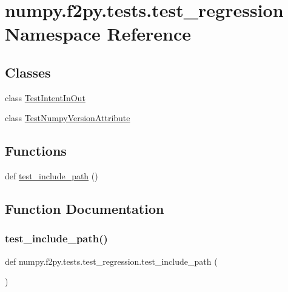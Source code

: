 \hypertarget{namespacenumpy_1_1f2py_1_1tests_1_1test__regression}{}\section{numpy.\+f2py.\+tests.\+test\+\_\+regression Namespace Reference}
\label{namespacenumpy_1_1f2py_1_1tests_1_1test__regression}
\subsection*{Classes}
\begin{DoxyCompactItemize}
\item 
class \hyperlink{classnumpy_1_1f2py_1_1tests_1_1test__regression_1_1TestIntentInOut}{Test\+Intent\+In\+Out}
\item 
class \hyperlink{classnumpy_1_1f2py_1_1tests_1_1test__regression_1_1TestNumpyVersionAttribute}{Test\+Numpy\+Version\+Attribute}
\end{DoxyCompactItemize}
\subsection*{Functions}
\begin{DoxyCompactItemize}
\item 
def \hyperlink{namespacenumpy_1_1f2py_1_1tests_1_1test__regression_abeb7ac728d680221a6d76ff32ce069ba}{test\+\_\+include\+\_\+path} ()
\end{DoxyCompactItemize}


\subsection{Function Documentation}
\mbox{\label{namespacenumpy_1_1f2py_1_1tests_1_1test__regression_abeb7ac728d680221a6d76ff32ce069ba}} 
\subsubsection{\texorpdfstring{test\+\_\+include\+\_\+path()}{test\_include\_path()}}
{\footnotesize\ttfamily def numpy.\+f2py.\+tests.\+test\+\_\+regression.\+test\+\_\+include\+\_\+path (\begin{DoxyParamCaption}{ }\end{DoxyParamCaption})}

